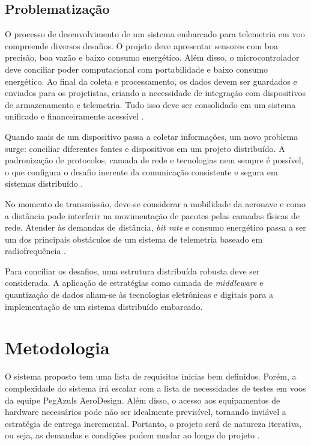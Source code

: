 \subsection{Problematização}
O processo de desenvolvimento de um sistema embarcado para telemetria em voo compreende diversos desafios. O projeto deve apresentar sensores com boa precisão, boa vazão e baixo consumo energético. Além disso, o microcontrolador deve conciliar poder computacional com portabilidade e baixo consumo energético. Ao final da coleta e processamento, os dados devem ser guardados e enviados para os projetistas, criando a necessidade de integração com dispositivos de armazenamento e telemetria. Tudo isso deve ser consolidado em um sistema unificado e financeiramente acessível \cite{white_embedded_systems}.

Quando mais de um dispositivo passa a coletar informações, um novo problema surge: conciliar diferentes fontes e dispositivos em um projeto distribuído. A padronização de protocolos, camada de rede e tecnologias nem sempre é possível, o que configura o desafio inerente da comunicação consistente e segura em sistemas distribuído \cite{coulouris_distributed}.

No momento de transmissão, deve-se considerar a mobilidade da aeronave e como a distância pode interferir na movimentação de pacotes pelas camadas físicas de rede. Atender às demandas de distância, \textit{bit rate} e consumo energético passa a ser um dos principais obstáculos de um sistema de telemetria baseado em radiofrequência \cite{haykin_communication}.

Para conciliar os desafios, uma estrutura distribuída robusta deve ser considerada. A aplicação de estratégias como camada de \textit{middleware} \cite{coulouris_distributed} e quantização de dados \cite{quantization} aliam-se às tecnologias eletrônicas e digitais para a implementação de um sistema distribuído embarcado.

\section{Metodologia}
O sistema proposto tem uma lista de requisitos inicias bem definidos. Porém, a complexidade do sistema irá escalar com a lista de necessidades de testes em voos da equipe PegAzuls AeroDesign. Além disso, o acesso aos equipamentos de hardware necessários pode não ser idealmente previsível, tornando inviável a estratégia de entrega incremental. Portanto, o projeto será de natureza iterativa, ou seja, as demandas e condições podem mudar ao longo do projeto \cite{sommerville_eng_software}.

